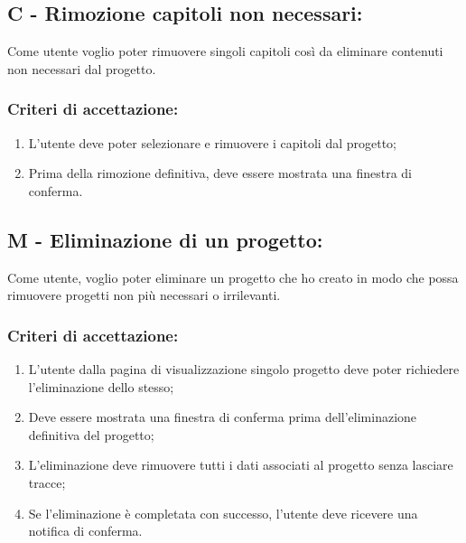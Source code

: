 \vspace{0.5cm}

\subsection*{C - Rimozione capitoli non necessari:}

\noindent Come utente voglio poter rimuovere singoli capitoli così da eliminare contenuti non necessari dal progetto. 

\subsubsection*{Criteri di accettazione:}

\begin{enumerate}
    \item L'utente deve poter selezionare e rimuovere i capitoli dal progetto;
    \item Prima della rimozione definitiva, deve essere mostrata una finestra di conferma.
\end{enumerate}

\vspace{0.5cm}

\subsection*{M - Eliminazione di un progetto:}

\noindent Come utente, voglio poter eliminare un progetto che ho creato in modo che possa rimuovere progetti non più necessari o irrilevanti.

\subsubsection*{Criteri di accettazione:}

\begin{enumerate}
    \item L'utente dalla pagina di visualizzazione singolo progetto deve poter richiedere l’eliminazione dello stesso;
    \item Deve essere mostrata una finestra di conferma prima dell'eliminazione definitiva del progetto;
    \item L'eliminazione deve rimuovere tutti i dati associati al progetto senza lasciare tracce;
    \item Se l'eliminazione è completata con successo, l'utente deve ricevere una notifica di conferma.
\end{enumerate}

